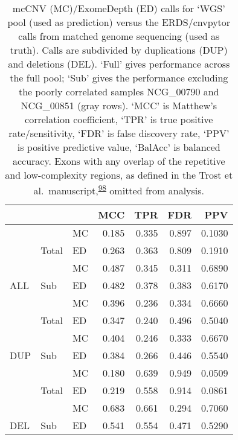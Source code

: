 \documentclass[11pt,letterpaper,oneside]{book}
\begin{document}
\begin{table}

\caption[mcCNV and ExomeDepth performance predicting calls from genome sequencing.]{\label{tab:predMet}mcCNV (MC)/ExomeDepth (ED) calls for `WGS' pool (used as prediction) versus the ERDS/cnvpytor calls from matched genome sequencing (used as truth). Calls are subdivided by duplications (DUP) and deletions (DEL). `Full' gives performance across the full pool; `Sub' gives the performance excluding the poorly correlated samples NCG\_00790 and NCG\_00851 (gray rows). `MCC' is Matthew's correlation coefficient, `TPR' is true positive rate/sensitivity, `FDR' is false discovery rate, `PPV' is positive predictive value, `BalAcc' is balanced accuracy. Exons with any overlap of the repetitive and low-complexity regions, as defined in the Trost et al.~manuscript,\textsuperscript{\protect\hyperlink{ref-trost:2018aa}{98}} omitted from analysis.}
\centering
\begin{tabular}[t]{lllrrrr}
\toprule
 &  &  & MCC & TPR & FDR & PPV\\
\midrule
 &  & MC & 0.185 & 0.335 & 0.897 & 0.1030\\
\cmidrule{3-7}
 & \multirow{-2}{*}{\raggedright\arraybackslash Total} & ED & 0.263 & 0.363 & 0.809 & 0.1910\\
\cmidrule{2-7}
 &  & MC & 0.487 & 0.345 & 0.311 & 0.6890\\
\cmidrule{3-7}
\multirow{-4}{*}{\raggedright\arraybackslash ALL} & \multirow{-2}{*}{\raggedright\arraybackslash Sub} & ED & 0.482 & 0.378 & 0.383 & 0.6170\\
\cmidrule{1-7}
 &  & MC & 0.396 & 0.236 & 0.334 & 0.6660\\
\cmidrule{3-7}
 & \multirow{-2}{*}{\raggedright\arraybackslash Total} & ED & 0.347 & 0.240 & 0.496 & 0.5040\\
\cmidrule{2-7}
 &  & MC & 0.404 & 0.246 & 0.333 & 0.6670\\
\cmidrule{3-7}
\multirow{-4}{*}{\raggedright\arraybackslash DUP} & \multirow{-2}{*}{\raggedright\arraybackslash Sub} & ED & 0.384 & 0.266 & 0.446 & 0.5540\\
\cmidrule{1-7}
 &  & MC & 0.180 & 0.639 & 0.949 & 0.0509\\
\cmidrule{3-7}
 & \multirow{-2}{*}{\raggedright\arraybackslash Total} & ED & 0.219 & 0.558 & 0.914 & 0.0861\\
\cmidrule{2-7}
 &  & MC & 0.683 & 0.661 & 0.294 & 0.7060\\
\cmidrule{3-7}
\multirow{-4}{*}{\raggedright\arraybackslash DEL} & \multirow{-2}{*}{\raggedright\arraybackslash Sub} & ED & 0.541 & 0.554 & 0.471 & 0.5290\\
\bottomrule
\end{tabular}
\end{table}
\end{document}
